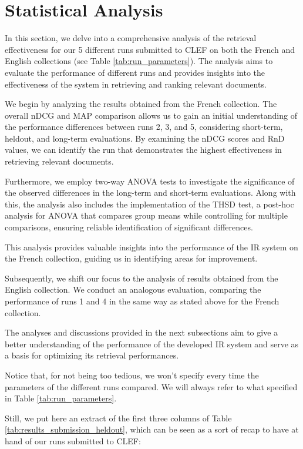 \section{Statistical Analysis}
\label{sec:analysis}

In this section, we delve into a comprehensive analysis of the retrieval effectiveness for our 5 different runs submitted to \ac{CLEF} on both the French and English collections (see Table \ref{tab:run_parameters}). 
The analysis aims to evaluate the performance of different runs and provides insights into the effectiveness of the system in retrieving and ranking relevant documents.

We begin by analyzing the results obtained from the French collection. 
The overall \ac{nDCG} and \ac{MAP} comparison allows us to gain an initial understanding of the performance differences between runs 2, 3, and 5, considering short-term, heldout, and long-term evaluations. 
By examining the \ac{nDCG} scores and \ac{RnD} values, we can identify the run that demonstrates the highest effectiveness in retrieving relevant documents.

Furthermore, we employ two-way \ac{ANOVA} tests to investigate the significance of the observed differences in the long-term and short-term evaluations.
Along with this, the analysis also includes the implementation of the \acl{THSD} test, a post-hoc analysis for \ac{ANOVA} that compares group means while controlling for multiple comparisons, ensuring reliable identification of significant differences.

This analysis provides valuable insights into the performance of the \ac{IR} system on the French collection, guiding us in identifying areas for improvement.

Subsequently, we shift our focus to the analysis of results obtained from the English collection. 
We conduct an analogous evaluation, comparing the performance of runs 1 and 4 in the same way as stated above for the French collection. 

The analyses and discussions provided in the next subsections aim to give a better understanding of the performance of the developed \ac{IR} system and serve as a basis for optimizing its retrieval performances.

Notice that, for not being too tedious, we won't specify every time the parameters of the different runs compared. 
We will always refer to what specified in Table \ref{tab:run_parameters}. 

Still, we put here an extract of the first three columns of Table \ref{tab:results_submission_heldout}, which can be seen as a sort of recap to have at hand of our runs submitted to \ac{CLEF}:

